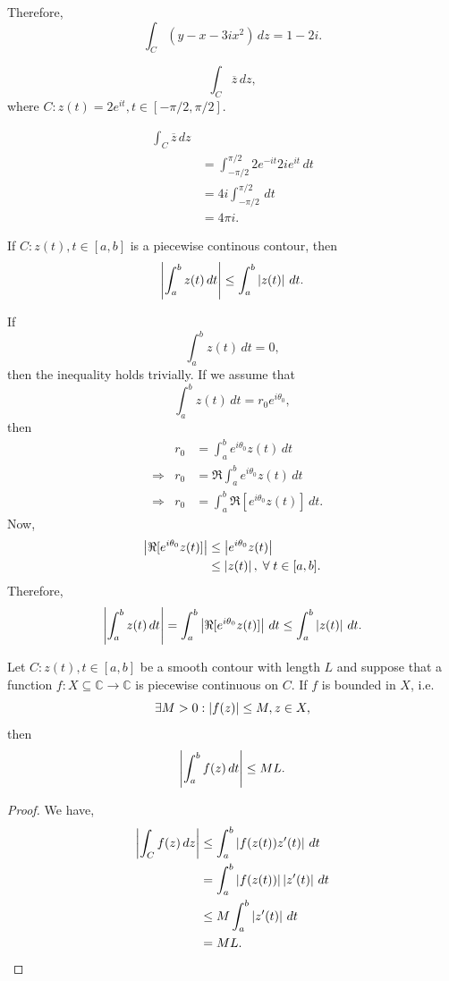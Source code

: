 \documentclass[12pt]{book}
\begin{document}
Therefore,
\[
    \int_{C} (y - x - 3ix^2)\,dz = 1 - 2i.
\]

\begin{exmp}
    \[
        \int_{C} \overline{z}\,dz,
    \]
    where $C: z(t) = 2e^{it}, t \in [-\pi/2, \pi/2].$
\end{exmp}

\begin{align}
    \int_{C} \overline{z}\,dz \\
        &=
            \int_{-\pi/2}^{\pi/2}2e^{-it}2ie^{it}\,dt \\
        &=
            4i\int_{-\pi/2}^{\pi/2}\,dt \\
        &=
            4\pi i.
\end{align}

\begin{thm}
    If $C: z(t), t \in [a, b]$ is a piecewise continous contour, then 
    \[
        \left\lvert \int_{a}^{b} z(t)\,dt \right\rvert \leq \int_{a}^{b}\left\lvert z(t) \right\rvert\,dt. 
    \]
\end{thm}
If
\[
    \int_{a}^{b} z(t)\,dt = 0,
\]
then the inequality holds trivially.
If we assume that 
\[
    \int_{a}^{b} z(t)\,dt = r_0e^{i\theta_0},
\]
then
\begin{align*}
    &&r_0
        &=
            \int_{a}^{b} e^{i\theta_0}z(t)\,dt \\
    &\Rightarrow &r_0
        &=
            \Re \int_{a}^{b} e^{i\theta_0}z(t)\,dt \\ 
    &\Rightarrow &r_0
        &=
            \int_{a}^{b} \Re [e^{i\theta_0}z(t)]\,dt.
\end{align*}
Now,
\begin{align*}
    \left\lvert \Re [e^{i\theta_0}z(t)] \right\rvert
        &\leq
            \left\lvert e^{i\theta_0}z(t) \right\rvert \\
        &\leq
            \left\lvert z(t) \right\rvert, \;\forall\; t \in [a, b].
\end{align*}
Therefore,
\[
    \left\lvert \int_{a}^{b} z(t)\,dt \right\rvert = \int_{a}^{b}\left\lvert \Re[e^{i\theta_0}z(t)] \right\rvert\,dt \leq \int_{a}^{b}\left\lvert z(t) \right\rvert\,dt.
\]

\begin{thm}
    Let $C: z(t), t \in [a, b]$ be a smooth contour with length $L$ and suppose that a function $f: X \subseteq \mathbb{C} \rightarrow \mathbb{C}$ is piecewise continuous on $C.$ If $f$ is bounded in $X$, i.e.
    \[
        \exists M > 0: \left\lvert f(z) \right\rvert \leq M, z \in X,
    \]
    then
    \[
        \left\lvert \int_{a}^{b} f(z)\,dt \right\rvert \leq ML.
    \]
\end{thm}
\begin{proof}
    We have,
    \begin{align*}
        \left\lvert \int_{C}f(z)\,dz \right\rvert
            &\leq
                \int_{a}^{b} \left\lvert f(z(t))z'(t) \right\rvert\,dt \\
            &=
                \int_{a}^{b} \left\lvert f(z(t)) \right\rvert\left\lvert z'(t) \right\rvert\,dt \\
            &\leq
                M\int_{a}^{b}\left\lvert z'(t) \right\rvert\,dt \\
            &=
                ML.
    \end{align*}
\end{proof}
\end{document}
